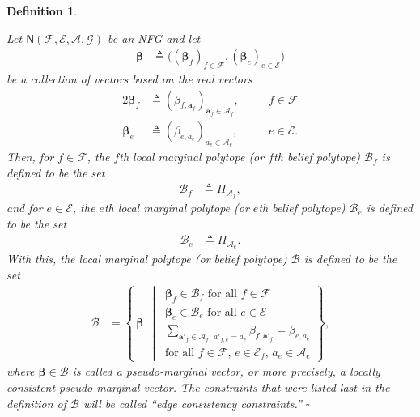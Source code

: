 \documentclass[journal, twocolumn]{IEEEtran}
\renewcommand{\mathbf}[1]{{\bm{#1}}}
\newcommand{\vect}[1]{\mathbf{#1}}
\newcommand{\set}[1]{\mathcal{#1}}
\newcommand{\graph}[1]{\mathsf{#1}}
\newcommand{\defeq}{\triangleq}
\newcommand{\bel}{\beta}
\newcommand{\vbel}{\boldsymbol{\bel}}
\newcommand{\setA}{\set{A}}
\newcommand{\setE}{\set{E}}
\newcommand{\setF}{\set{F}}
\newcommand{\setG}{\set{G}}
\newcommand{\va}{\vect{a}}
\newcommand{\lmpB}{\mathcal{B}}
\newcommand{\graphN}{\graph{N}}
\newcommand{\?}{\mathrm{?}}
\newcommand{\qedwhite}{\hspace*{\fill}%
  $\square$\smallskip}
\newcommand{\defend}{\qedwhite}
\newcommand{\setPi}{\Pi}
\newtheorem{Definition}[Lemma]{Definition}
\begin{document}
\begin{Definition}
  \label{def:lmp:1}

  Let $\graphN(\setF,\setE, \setA, \setG)$ be an NFG and let
  \begin{align*}
    \vbel
      &\defeq
         \big(
           (\vbel_f)_{f \in \setF},
           (\vbel_e)_{e \in \setE}
         \big)
  \end{align*}
  be a collection of vectors based on the real vectors
  \begin{alignat*}{2}
    \vbel_f
      &\defeq
         (\bel_{f,\va_f})_{\va_f \in \setA_f},
           \quad && f \in \setF \\
    \vbel_e
      &\defeq
         (\bel_{e,a_e})_{a_e \in \setA_e},
           \quad && e \in \setE.
  \end{alignat*}
  Then, for $f \in \setF$, the $f$th local marginal polytope (or $f$th belief
  polytope) $\lmpB_f$ is defined to be the set
  \begin{align*}
    \lmpB_f
      &\defeq
         \setPi_{\setA_f},
  \end{align*}
  and for $e \in \setE$, the $e$th local marginal polytope (or $e$th belief
  polytope) $\lmpB_e$ is defined to be the set
  \begin{align*}
    \lmpB_e
      &\defeq
         \setPi_{\setA_e}.
  \end{align*}
  With this, the local marginal polytope (or belief polytope) $\lmpB$ is
  defined to be the set
  \begin{align*}
    \lmpB
      &= \left\{
           \ \vbel \ 
         \ 
         \middle|
         \ 
           \begin{array}{c}
             \vbel_f \in \lmpB_f \text{ for all $f \in \setF$} \\[0.05cm]
             \vbel_e \in \lmpB_e \text{ for all $e \in \setE$} \\[0.25cm]
             \sum\limits_{\va'_f \in \setA_f: \, a'_{f,e} = a_e} 
               \bel_{f, \va'_f} = \bel_{e, a_e} \\
             \text{for all $f \in \setF$,
                   $e \in \setE_f$,
                   $a_e \in \setA_e$}
           \end{array}
         \right\},
  \end{align*}
  where $\vbel \in \lmpB$ is called a pseudo-marginal vector, or more
  precisely, a locally consistent pseudo-marginal vector. The constraints that
  were listed last in the definition of $\lmpB$ will be called ``edge
  consistency constraints.''
  \defend
\end{Definition}
\end{document}
